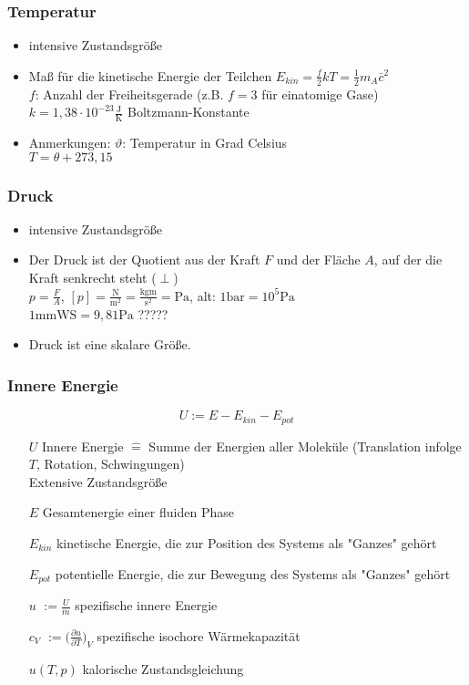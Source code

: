 \documentclass[10pt,a4paper]{article}
\begin{document}
\subsubsection{Temperatur}

\begin{itemize}
\item intensive Zustandsgröße
\item Maß für die kinetische Energie der Teilchen $E_{kin} = \frac{f}{2} k T = \frac{1}{2} m_A \bar{c}^2$ \\
$f$: Anzahl der Freiheitsgerade (z.B. $f=3$ für einatomige Gase) \\
$k = 1,38 \cdot 10^{-23} \frac{\text{J}}{\text{K}}$ Boltzmann-Konstante
\item Anmerkungen: $\vartheta$: Temperatur in Grad Celsius \\
\phantom{Anmerkungen:} $T = \theta + 273,15$
\end{itemize}

\subsubsection{Druck}

\begin{itemize}
\item intensive Zustandsgröße
\item Der Druck ist der Quotient aus der Kraft $F$ und der Fläche $A$, auf der die Kraft senkrecht steht ($\perp$) \\
$p = \frac{F}{A}$, $[p] = \frac{\text{N}}{\text{m}^2} = \frac{\text{kg} \text{m}}{\text{s}^2} = \text{Pa}$, alt: $1 \text{bar} = 10^5 \text{Pa}$ \\
$1 \text{mm} \text{W} \text{S} = 9,81 \text{Pa}$ ????? %
\item Druck ist eine skalare Größe.
\end{itemize}

\subsubsection{Innere Energie}

\[ U := E - E_{kin} - E_{pot} \]
\begin{itemize}
\item[$U$] Innere Energie $\widehat{=}$ Summe der Energien aller Moleküle (Translation infolge $T$, Rotation, Schwingungen) \\
Extensive Zustandsgröße
\item[$E$] Gesamtenergie einer fluiden Phase
\item[$E_{kin}$] kinetische Energie, die zur Position des Systems als "Ganzes" gehört
\item[$E_{pot}$] potentielle Energie, die zur Bewegung des Systems als "Ganzes" gehört
\end{itemize}
\begin{itemize}
\item[$u$] $:= \frac{U}{m}$ spezifische innere Energie
\item[$c_V$] $:= \big( \frac{\partial u}{\partial T} \big)_V$ spezifische isochore Wärmekapazität
\item[$u(T, p)$] kalorische Zustandsgleichung
\end{itemize}
\end{document}
